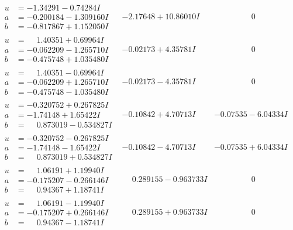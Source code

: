 \documentclass[1p]{elsarticle_modified}
\theoremstyle{definition}
\begin{document}
$$\begin{array}{c|c|c}
\begin{aligned}
u &= -1.34291 - 0.74284 I \\
a &= -0.200184 - 1.309160 I \\
b &= -0.817867 + 1.152050 I\end{aligned}
 & -2.17648 + 10.86010 I & \phantom{-0.000000 } 0 \\ \hline\begin{aligned}
u &= \phantom{-}1.40351 + 0.69964 I \\
a &= -0.062209 - 1.265710 I \\
b &= -0.475748 + 1.035480 I\end{aligned}
 & -0.02173 + 4.35781 I & \phantom{-0.000000 } 0 \\ \hline\begin{aligned}
u &= \phantom{-}1.40351 - 0.69964 I \\
a &= -0.062209 + 1.265710 I \\
b &= -0.475748 - 1.035480 I\end{aligned}
 & -0.02173 - 4.35781 I & \phantom{-0.000000 } 0 \\ \hline\begin{aligned}
u &= -0.320752 + 0.267825 I \\
a &= -1.74148 + 1.65422 I \\
b &= \phantom{-}0.873019 - 0.534827 I\end{aligned}
 & -0.10842 + 4.70713 I & -0.07535 - 6.04334 I \\ \hline\begin{aligned}
u &= -0.320752 - 0.267825 I \\
a &= -1.74148 - 1.65422 I \\
b &= \phantom{-}0.873019 + 0.534827 I\end{aligned}
 & -0.10842 - 4.70713 I & -0.07535 + 6.04334 I \\ \hline\begin{aligned}
u &= \phantom{-}1.06191 + 1.19940 I \\
a &= -0.175207 - 0.266146 I \\
b &= \phantom{-}0.94367 + 1.18741 I\end{aligned}
 & \phantom{-}0.289155 - 0.963733 I & \phantom{-0.000000 } 0 \\ \hline\begin{aligned}
u &= \phantom{-}1.06191 - 1.19940 I \\
a &= -0.175207 + 0.266146 I \\
b &= \phantom{-}0.94367 - 1.18741 I\end{aligned}
 & \phantom{-}0.289155 + 0.963733 I & \phantom{-0.000000 } 0 \\ \hline\begin{aligned}

\end{aligned}
\end{array}$$
\end{document}
